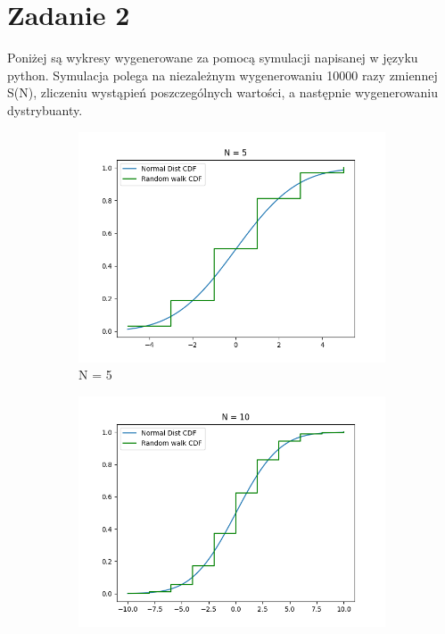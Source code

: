 \documentclass{report}
\begin{document}
\section*{Zadanie 2}
Poniżej są wykresy wygenerowane za pomocą symulacji napisanej w języku python.
Symulacja polega na niezależnym wygenerowaniu 10000 razy zmiennej S(N),
zliczeniu wystąpień poszczególnych wartości, a następnie wygenerowaniu dystrybuanty.
\begin{figure}[H]
    \centering
    \begin{subfigure}{.5\textwidth}
      \centering
      \includegraphics[width=1.1\linewidth]{plotN5.png}
      \caption{N = 5}
      \label{fig:plotbnfunc1}
    \end{subfigure}%
    \begin{subfigure}{.5\textwidth}
      \centering
      \includegraphics[width=1.1\linewidth]{plotN10.png}

\end{subfigure}
\end{figure}
\end{document}
